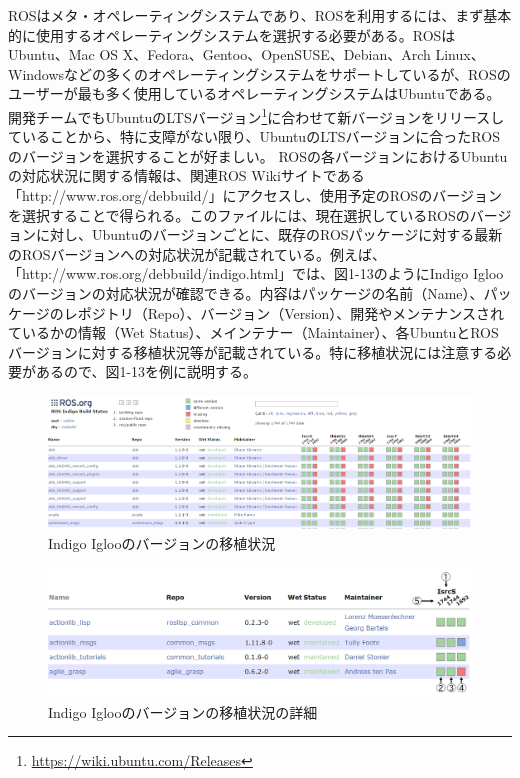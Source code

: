 {{ROSはメタ・オペレーティングシステムであり、ROSを利用するには、まず基本的に使用するオペレーティングシステムを選択する必要がある。ROSはUbuntu、Mac OS X、Fedora、Gentoo、OpenSUSE、Debian、Arch Linux、Windowsなどの多くのオペレーティングシステムをサポートしているが、ROSのユーザーが最も多く使用しているオペレーティングシステムはUbuntuである。開発チームでもUbuntuのLTSバージョン\footnote{\url{https://wiki.ubuntu.com/Releases}}に合わせて新バージョンをリリースしていることから、特に支障がない限り、UbuntuのLTSバージョンに合ったROSのバージョンを選択することが好ましい。
ROSの各バージョンにおけるUbuntuの対応状況に関する情報は、関連ROS Wikiサイトである「http://www.ros.org/debbuild/」にアクセスし、使用予定のROSのバージョンを選択することで得られる。このファイルには、現在選択しているROSのバージョンに対し、Ubuntuのバージョンごとに、既存のROSパッケージに対する最新のROSバージョンへの対応状況が記載されている。例えば、「http://www.ros.org/debbuild/indigo.html」では、図1-13のようにIndigo Iglooのバージョンの対応状況が確認できる。内容はパッケージの名前（Name）、パッケージのレポジトリ（Repo）、バージョン（Version）、開発やメンテナンスされているかの情報（Wet Status）、メインテナー（Maintainer）、各UbuntuとROSバージョンに対する移植状況等が記載されている。特に移植状況には注意する必要があるので、図1-13を例に説明する。

\begin{figure}[h]
  \centering
  \includegraphics[width=\columnwidth]{pictures/chapter1/pic_01_09.png}
  \caption{Indigo Iglooのバージョンの移植状況}
\end{figure}

\begin{figure}[h]
  \centering
  \includegraphics[width=\columnwidth]{pictures/chapter1/pic_01_10.png}
  \caption{Indigo Iglooのバージョンの移植状況の詳細}
\end{figure}

}}
